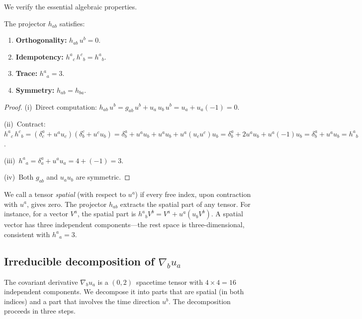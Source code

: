 We verify the essential algebraic properties.

\begin{proposition}[Properties of $h_{ab}$]
\label{prop:hab-properties}
The projector $h_{ab}$ satisfies:
\begin{enumerate}
\item[\emph{(i)}] \textbf{Orthogonality:} $h_{ab}\,u^b = 0$.
\item[\emph{(ii)}] \textbf{Idempotency:}
  $h^a{}_c\,h^c{}_b = h^a{}_b$.
\item[\emph{(iii)}] \textbf{Trace:} $h^a{}_a = 3$.
\item[\emph{(iv)}] \textbf{Symmetry:} $h_{ab} = h_{ba}$.
\end{enumerate}
\end{proposition}

\begin{proof}
(i)~Direct computation:
$h_{ab}\,u^b = g_{ab}\,u^b + u_a\,u_b\,u^b
= u_a + u_a(-1) = 0$.

(ii)~Contract:
$h^a{}_c\,h^c{}_b
= (\delta^a_c + u^a u_c)(\delta^c_b + u^c u_b)
= \delta^a_b + u^a u_b + u^a u_b + u^a(u_c u^c)u_b
= \delta^a_b + 2u^a u_b + u^a(-1)u_b
= \delta^a_b + u^a u_b = h^a{}_b$.

(iii)~$h^a{}_a = \delta^a_a + u^a u_a = 4 + (-1) = 3$.

(iv)~Both $g_{ab}$ and $u_a u_b$ are symmetric.
\end{proof}

We call a tensor \emph{spatial} (with respect to $u^a$) if
every free index, upon contraction with $u^a$, gives zero.  The
projector $h_{ab}$ extracts the spatial part of any tensor.  For
instance, for a vector $V^a$, the spatial part is
$h^a{}_b V^b = V^a + u^a(u_b V^b)$.  A spatial vector has
three independent components---the rest space is
three-dimensional, consistent with $h^a{}_a = 3$.


\subsection{Irreducible decomposition of $\nabla_b u_a$}
\label{sec:irred-decomp}

The covariant derivative $\nabla_b u_a$ is a
$(0,2)$~spacetime tensor with $4 \times 4 = 16$ independent
components.  We decompose it into parts that are spatial (in
both indices) and a part that involves the time direction $u^b$.
The decomposition proceeds in three steps.

